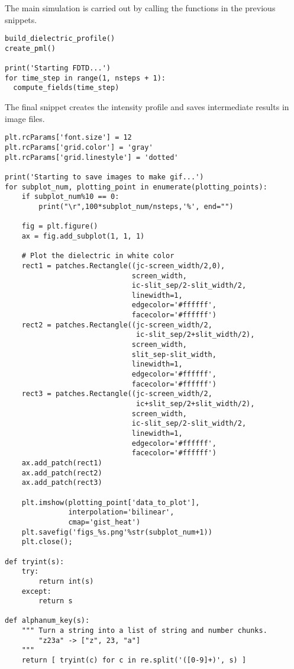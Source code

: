 \documentclass[11pt]{article}
\numberwithin{equation}{section}
\begin{document}
The main simulation is carried out by calling the functions in the previous
snippets.
\begin{verbatim}
build_dielectric_profile()
create_pml()

print('Starting FDTD...')
for time_step in range(1, nsteps + 1):
  compute_fields(time_step)
\end{verbatim}

The final snippet creates the intensity profile and saves intermediate results
in image files.
\begin{verbatim}
plt.rcParams['font.size'] = 12
plt.rcParams['grid.color'] = 'gray'
plt.rcParams['grid.linestyle'] = 'dotted'

print('Starting to save images to make gif...')
for subplot_num, plotting_point in enumerate(plotting_points):
    if subplot_num%10 == 0:
        print("\r",100*subplot_num/nsteps,'%', end="")

    fig = plt.figure()
    ax = fig.add_subplot(1, 1, 1)

    # Plot the dielectric in white color
    rect1 = patches.Rectangle((jc-screen_width/2,0),
                              screen_width,
                              ic-slit_sep/2-slit_width/2,
                              linewidth=1,
                              edgecolor='#ffffff',
                              facecolor='#ffffff')
    rect2 = patches.Rectangle((jc-screen_width/2,
                               ic-slit_sep/2+slit_width/2),
                              screen_width,
                              slit_sep-slit_width,
                              linewidth=1,
                              edgecolor='#ffffff',
                              facecolor='#ffffff')
    rect3 = patches.Rectangle((jc-screen_width/2,
                               ic+slit_sep/2+slit_width/2),
                              screen_width,
                              ic-slit_sep/2-slit_width/2,
                              linewidth=1,
                              edgecolor='#ffffff',
                              facecolor='#ffffff')
    ax.add_patch(rect1)
    ax.add_patch(rect2)
    ax.add_patch(rect3)

    plt.imshow(plotting_point['data_to_plot'],
               interpolation='bilinear',
               cmap='gist_heat')
    plt.savefig('figs_%s.png'%str(subplot_num+1))
    plt.close();

def tryint(s):
    try:
        return int(s)
    except:
        return s

def alphanum_key(s):
    """ Turn a string into a list of string and number chunks.
        "z23a" -> ["z", 23, "a"]
    """
    return [ tryint(c) for c in re.split('([0-9]+)', s) ]


\end{verbatim}
\end{document}
